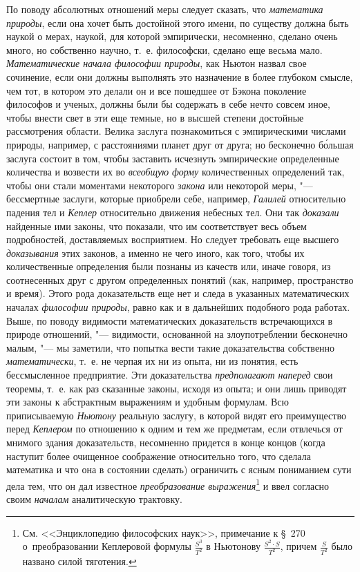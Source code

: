 По поводу абсолютных отношений меры следует сказать, что
{\em математика природы}, если она хочет быть достойной
этого имени, по существу должна быть наукой о мерах, наукой, для которой
эмпирически, несомненно, сделано очень много, но собственно научно, т.~е.
философски, сделано еще весьма мало.
{\em Математические начала философии природы}, как
Ньютон назвал свое сочинение, если они должны выполнять это назначение в
более глубоком смысле, чем тот, в котором это делали он и все пошедшее от
Бэкона поколение философов и ученых, должны были бы содержать в себе нечто
совсем иное, чтобы внести свет в эти еще темные, но в высшей степени
достойные рассмотрения области. Велика заслуга познакомиться с
эмпирическими числами природы, например, с расстояниями планет друг от
друга; но бесконечно б\'{о}льшая заслуга состоит в том, чтобы заставить
исчезнуть эмпирические определенные количества и возвести их во
{\em всеобщую форму} количественных определений так,
чтобы они стали моментами некоторого {\em закона} или
некоторой меры, "--- бессмертные заслуги, которые приобрели себе, например,
{\em Галилей} относительно падения тел и
{\em Кеплер} относительно движения небесных тел. Они
так {\em доказали} найденные ими законы, что показали,
что им соответствует весь объем подробностей, доставляемых восприятием. Но
следует требовать еще высшего {\em доказывания} этих
законов, а именно не чего иного, как того, чтобы их количественные
определения были познаны из качеств или, иначе говоря, из соотнесенных друг
с другом определенных понятий (как, например, пространство и время). Этого
рода доказательств еще нет и следа в указанных математических началах
{\em философии природы}, равно как и в дальнейших
подобного рода работах. Выше, по поводу видимости математических
доказательств встречающихся в природе отношений, "--- видимости, основанной на
злоупотреблении бесконечно малым, "--- мы заметили, что попытка вести такие
доказательства собственно {\em математически}, т.~е. не
черпая их ни из опыта, ни из понятия, есть бессмысленное предприятие. Эти
доказательства {\em предполагают наперед} свои
теоремы, т.~е. как раз сказанные законы, исходя из опыта; и они лишь
приводят эти законы к абстрактным выражениям и удобным формулам. Всю
приписываемую {\em Ньютону} реальную заслугу, в которой
видят его преимущество перед {\em Кеплером} по
отношению к одним и тем же предметам, если отвлечься от мнимого здания
доказательств, несомненно придется в конце концов (когда наступит более
очищенное соображение относительно того, что сделала математика и что она в
состоянии сделать) ограничить с ясным пониманием сути дела тем, что он дал
известное {\em преобразование выражения}\footnote{См. <<Энциклопедию
философских наук>>, примечание к \S~270 о~преобразовании Кеплеровой формулы
$\frac{S^3}{T^2}$ в Ньютонову $\frac{S^2\cdot S}{T^2}$,
причем $\frac{S}{T^2}$ было названо силой тяготения.}
и ввел согласно своим {\em началам} аналитическую трактовку.

